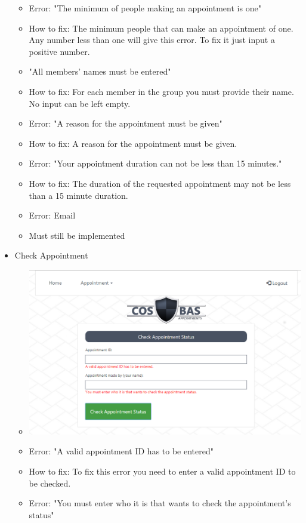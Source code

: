\begin{itemize}
\begin{itemize}
				\item Error: "The minimum of people making an appointment is one"
				\item How to fix: The minimum people that can make an appointment of one. Any number less than one will give this error. To fix it just input a positive number. 
				\item "All members' names must be entered"
				\item How to fix: For each member in the group you must provide their name. No input can be left empty.
				\item Error: "A reason for the appointment must be given"
				\item How to fix: A reason for the appointment must be given.
				\item Error: "Your appointment duration can not be less than 15 minutes."
				\item How to fix: The duration of the requested appointment may not be less than a 15 minute duration.
				\item Error: Email
				\item Must still be implemented
			\end{itemize}
		\item Check Appointment
			\begin{itemize}
				\item \includegraphics[width=\linewidth]{images/Screenshots/CheckAppoint_Errors.png}								\item Error: "A valid appointment ID has to be entered"
				\item How to fix: To fix this error you need to enter a valid appointment ID to be checked. 
				\item Error: "You must enter who it is that wants to check the appointment's status"

\end{itemize}
\end{itemize}
